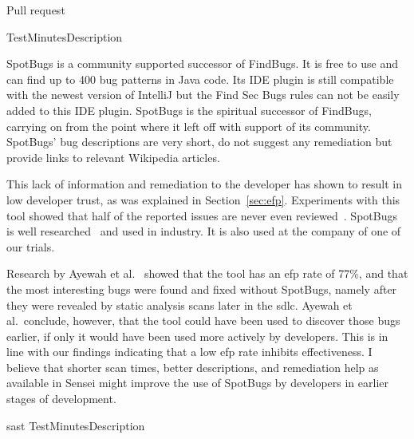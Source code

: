 {Pull request}


{Test}{Minutes}{Description}

{
\label{bc:SpotBugs}
SpotBugs is a community supported successor of FindBugs.
It is free to use and can find up to 400 bug patterns in Java code.
Its IDE plugin is still compatible with the newest version of IntelliJ but the Find Sec Bugs rules can not be easily added to this IDE plugin.
SpotBugs is the spiritual successor of FindBugs, carrying on from the point where it left off with support of its community.
SpotBugs' bug descriptions are very short, do not suggest any remediation but provide links to relevant Wikipedia articles. 

This lack of information and remediation to the developer has shown to result in low developer trust, as was explained in Section~\ref{sec:efp}.
Experiments with this tool showed that half of the reported issues are never even reviewed~\cite{ayewah2007using}.
SpotBugs is well researched~\cite{ayewah2007using,ayewah2010google,findbugs2008} and used in industry.
It is also used at the company of one of our trials.

Research by Ayewah et al.~\cite{ayewah2007using} showed that the tool has an \gls{efp} rate of 77\%, and that the most interesting bugs were found and fixed without SpotBugs, namely after they were revealed by static analysis scans later in the \gls{sdlc}. Ayewah et al.\ conclude, however, that the tool could have been used to discover those bugs earlier, if only it would have been used more actively by developers. This is in line with our findings indicating that a low \gls{efp} rate inhibits effectiveness. I believe that shorter scan times, better descriptions, and remediation help as available in Sensei might improve the use of SpotBugs by developers in earlier stages of development.
}{\gls{sast}}
{Test}{Minutes}{Description}

